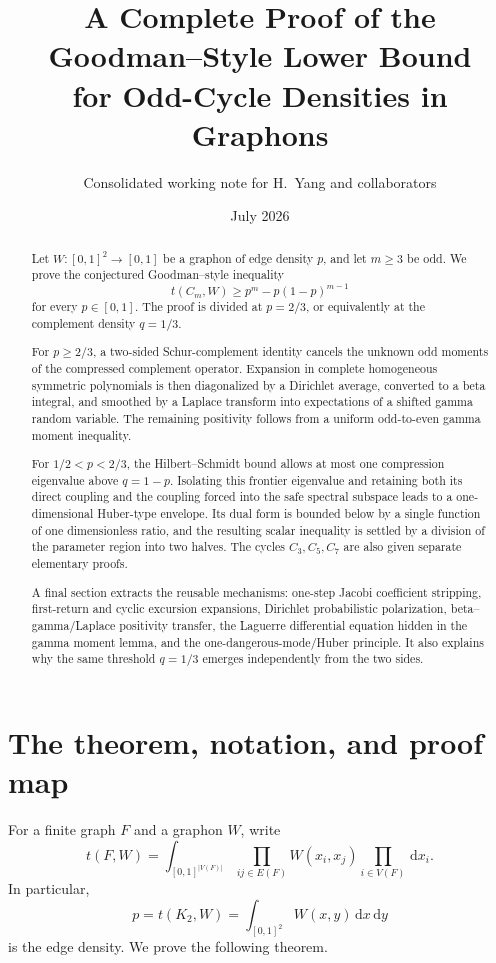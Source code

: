 ﻿\documentclass[11pt]{article}
\title{A Complete Proof of the Goodman--Style Lower Bound\\
for Odd-Cycle Densities in Graphons}
\author{Consolidated working note for H.~Yang and collaborators}
\date{July 2026}
\numberwithin{equation}{section}
\newcommand{\dd}{\,\mathrm d}
\begin{document}
\maketitle

\begin{abstract}
  Let $W:[0,1]^2\to[0,1]$ be a graphon of edge density $p$, and let $m\ge3$ be odd.
  We prove the conjectured Goodman--style inequality
  \[
    t(C_m,W)\ge p^m-p(1-p)^{m-1}
  \]
  for every $p\in[0,1]$.
  The proof is divided at $p=2/3$, or equivalently at the complement density $q=1/3$.

  For $p\ge2/3$, a two-sided Schur-complement identity cancels the unknown odd moments of the compressed complement operator.
  Expansion in complete homogeneous symmetric polynomials is then diagonalized by a Dirichlet average, converted to a beta integral, and smoothed by a Laplace transform into expectations of a shifted gamma random variable.
  The remaining positivity follows from a uniform odd-to-even gamma moment inequality.

  For $1/2<p<2/3$, the Hilbert--Schmidt bound allows at most one compression eigenvalue above $q=1-p$.
  Isolating this frontier eigenvalue and retaining both its direct coupling and the coupling forced into the safe spectral subspace leads to a one-dimensional Huber-type envelope.
  Its dual form is bounded below by a single function of one dimensionless ratio, and the resulting scalar inequality is settled by a division of the parameter region into two halves.
  The cycles $C_3,C_5,C_7$ are also given separate elementary proofs.

  A final section extracts the reusable mechanisms: one-step Jacobi coefficient stripping, first-return and cyclic excursion expansions, Dirichlet probabilistic polarization, beta--gamma/Laplace positivity transfer, the Laguerre differential equation hidden in the gamma moment lemma, and the one-dangerous-mode/Huber principle.
  It also explains why the same threshold $q=1/3$ emerges independently from the two sides.
\end{abstract}

\tableofcontents

\section{The theorem, notation, and proof map}\label{sec:intro}

For a finite graph $F$ and a graphon $W$, write
\[
  t(F,W)=\int_{[0,1]^{|V(F)|}}
  \prod_{ij\in E(F)}W(x_i,x_j)
  \prod_{i\in V(F)}\dd x_i.
\]
In particular,
\[
  p=t(K_2,W)=\int_{[0,1]^2}W(x,y)\dd x\dd y
\]
is the edge density.
We prove the following theorem.
\end{document}
